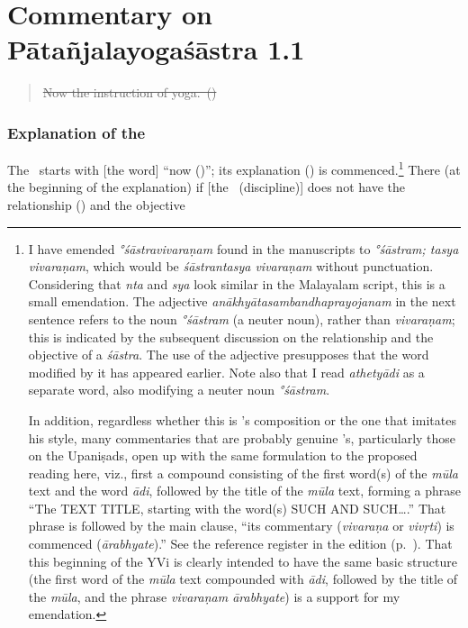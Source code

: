 \section{Commentary on Pātañjalayogaśāstra 1.1}
\begin{quotation}
\st{Now%
 the instruction of yoga.~()}
\end{quotation}

\subsubsection{Explanation of the \sutra}

The%
 \PYS\ starts with [the word] ``now (\atha{})'';  its explanation (\vivarana) is commenced.\footnote{\label{STRMTSY}I have emended \emph{°śāstravivaraṇam} found in the manuscripts to \emph{°śāstram; tasya vi\-va\-raṇam}, which would be \emph{śāstrantasya vivaraṇam} without punctuation.  Considering that \emph{nta} and \emph{sya} look similar in the Malayalam script, this is a small emendation.  The adjective \emph{anā\-khyā\-ta\-samba\-ndha\-pra\-yo\-janam} in the next sentence refers to the noun \emph{°śāstram} (a neuter noun), rather than \emph{vivaraṇam}; this is indicated by the subsequent discussion on the relationship and the objective of a \emph{śāstra}.  The use of the adjective presupposes that the word modified by it has appeared earlier.  Note also that I read \emph{athetyādi} as a separate word, also modifying a neuter noun \emph{°śāstram}.

In addition, regardless whether this is \Sankara's composition or the one that imitates his style, many commentaries that are probably genuine \Sankara's, particularly those on the Upaniṣads, open up with the same formulation to the proposed reading here, viz., first a compound consisting of the first word(s) of the \emph{mūla} text and the word \emph{ādi}, followed by the title of the \emph{mūla} text, forming a phrase ``The TEXT TITLE, starting with the word(s) SUCH AND SUCH\ldots.''  That phrase is followed by the main clause, ``its commentary (\emph{vivaraṇa} or \emph{vivṛti}) is commenced (\emph{ārabhyate}).''  See the reference register in the edition (p.~\pageref{FIRSTSTC}).  That this beginning of the YVi is clearly intended to have the same basic structure (the first word of the \emph{mūla} text compounded with \emph{ādi}, followed by the title of the \emph{mūla}, and the phrase \emph{vivaraṇam ārabhyate}) is a support for my emendation.}  There (at the beginning of the explanation) if [the \sastra\ (discipline)] does not have the relationship (\sambandha) and the objective
